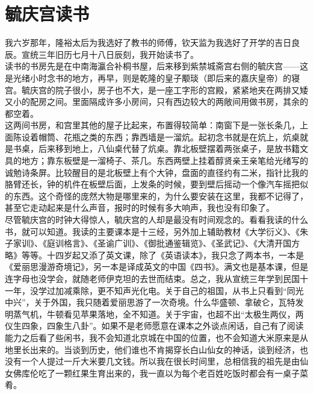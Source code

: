 \fancyhead[RO]{} %
\fancyhead[LE]{} %
\chapter*{毓庆宫读书}
\thispagestyle{empty}
我六岁那年，隆裕太后为我选好了教书的师傅，钦天监为我选好了开学的吉日良辰。宣统三年旧历七月十八日辰刻，我开始读书了。\\

读书的书房先是在中南海瀛合补桐书屋，后来移到紫禁城斋宫右侧的毓庆宫——这是光绪小时念书的地方，再早，则是乾隆的皇子颙琰（即后来的嘉庆皇帝）的寝宫。毓庆宫的院子很小，房子也不大，是一座工字形的宫殿，紧紧地夹在两排又矮又小的配房之间。里面隔成许多小房间，只有西边较大的两敞间用做书房，其余的都空着。\\

这两间书房，和宫里其他的屋子比起来，布置得较简单：南窗下是一张长条几，上面陈设着帽筒、花瓶之类的东西；靠西墙是一溜炕。起初念书就是在炕上，炕桌就是书桌，后来移到地上，八仙桌代替了炕桌。靠北板壁摆着两张桌子，是放书籍文具的地方；靠东板壁是一溜椅子、茶几。东西两壁上挂着醇贤亲王亲笔给光绪写的诚勉诗条屏。比较醒目的是北板壁上有个大钟，盘面的直径约有二米，指针比我的胳臂还长，钟的机件在板壁后面，上发条的时候，要到壁后摇动一个像汽车摇把似的东西。这个奇怪的庞然大物是哪里来的，为什么要安装在这里，我都不记得了，甚至它走动起来是什么声音，报时的时候有多大响声，我也没有印象了。\\

尽管毓庆宫的时钟大得惊人，毓庆宫的人却是最没有时间观念的。看看我读的什么书，就可以知道。我读的主要课本是十三经，另外加上辅助教材《大学衍义》、《朱子家训》、《庭训格言》、《圣谕广训》、《御批通鉴辑览》、《圣武记》、《大清开国方略》等等。十四岁起又添了英文课，除了《英语读本》，我只念了两本书，一本是《爱丽思漫游奇境记》，另一本是译成英文的中国《四书》。满文也是基本课，但是连字母也没学会，就随老师伊克坦的去世而结束。总之，我从宣统三年学到民国十一年，没学过加减乘除，更不知声光化电。关于自己的祖国，从书上只看到“同光中兴”，关于外国，我只随着爱丽思游了一次奇境。什么华盛顿、拿破仑，瓦特发明蒸气机，牛顿看见苹果落地，全不知道。关于宇宙，也超不出“太极生两仪，两仪生四象，四象生八卦”。如果不是老师愿意在课本之外谈点闲话，自己有了阅读能力之后看了些闲书，我不会知道北京城在中国的位置，也不会知道大米原来是从地里长出来的。当谈到历史，他们谁也不肯揭穿长白山仙女的神话，谈到经济，也没有一个人提过一斤大米要几文钱。所以我在很长时间里，总相信我的祖先是由仙女佛库伦吃了一颗红果生育出来的，我一直以为每个老百姓吃饭时都会有一桌子菜肴。\\

